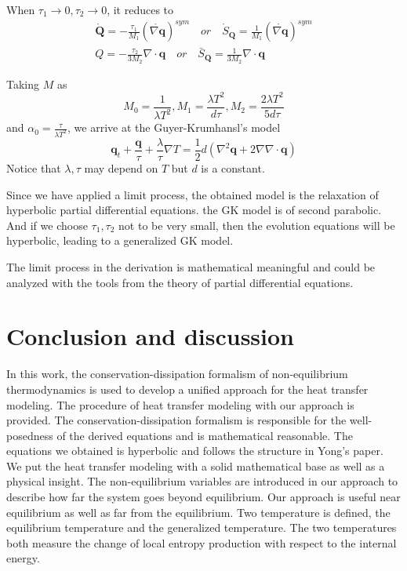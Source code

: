 \documentclass[a4paper]{article}
\begin{document}
When $\tau_1 \to 0, \tau_2 \to 0$, it reduces to
\begin{eqnarray} 
\mathring{\mathbf{Q}}=-\frac{\tau_1}{M_1}(\mathring{\nabla \mathbf{q}})^{sym} \quad  or \quad \mathring{S}_\mathbf{Q}=\frac{1}{M_1}(\mathring{\nabla \mathbf{q}})^{sym} \\
Q=-\frac{\tau_2}{3M_2}\nabla \cdot \mathbf{q} \quad or \quad \bar{S}_\mathbf{Q}=\frac{1}{3M_2} \nabla \cdot \mathbf{q}
\end{eqnarray}

Taking $M$ as
\begin{equation}
M_0=\frac{1}{\lambda T^2}, M_1=\frac{\lambda T^2}{d\tau}, M_2=\frac{2\lambda T^2}{5d\tau}
\end{equation}
and $\alpha_0=\frac{\tau}{\lambda T^2}$,
we arrive at the Guyer-Krumhansl's model \cite{Jou1996extended}
\begin{equation}
\mathbf{q}_t+\frac{\mathbf{q}}{\tau}+\frac{\lambda}{\tau}\nabla T=\frac{1}{2}d(\nabla^2 \mathbf{q}+2\nabla \nabla \cdot \mathbf{q})
\end{equation}
Notice that $\lambda, \tau$ may depend on $T$ but $d$ is a constant.

Since we have applied a limit process, the obtained model is the relaxation of hyperbolic partial differential equations. the GK model is of second parabolic. And if we choose $\tau_1,\tau_2$ not to be very small, then the evolution equations will be hyperbolic, leading to a generalized GK model.

The limit process in the derivation is mathematical meaningful and could be analyzed with the tools from the theory of partial differential equations\cite{yong2008interesting}.

\section{Conclusion and discussion}
In this work, the conservation-dissipation formalism of non-equilibrium thermodynamics is used to develop a unified approach for the heat transfer modeling. The procedure of heat transfer modeling with our approach is provided. The conservation-dissipation formalism is responsible for the well-posedness of the derived equations and is mathematical reasonable. The equations we obtained is hyperbolic and follows the structure in Yong's paper.\cite{yong2008interesting} We put the heat transfer modeling with a solid mathematical base as well as a physical insight. The non-equilibrium variables are introduced in our approach to describe how far the system goes beyond equilibrium. Our approach is useful near equilibrium as well as far from the equilibrium. Two temperature is defined, the equilibrium temperature and the generalized temperature. The two temperatures both measure the change of local entropy production with respect to the internal energy. 
\end{document}

